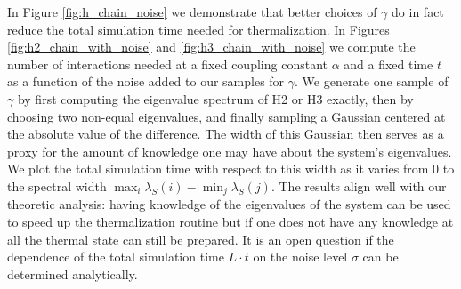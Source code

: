 In Figure \ref{fig:h_chain_noise} we demonstrate that better choices of $\gamma$ do in fact reduce the total simulation time needed for thermalization. In Figures \ref{fig:h2_chain_with_noise} and \ref{fig:h3_chain_with_noise} we compute the number of interactions needed at a fixed coupling constant $\alpha$ and a fixed time $t$ as a function of the noise added to our samples for $\gamma$. We generate one sample of $\gamma$ by first computing the eigenvalue spectrum of H2 or H3 exactly, then by choosing two non-equal eigenvalues, and finally sampling a Gaussian centered at the absolute value of the difference. The width of this Gaussian then serves as a proxy for the amount of knowledge one may have about the system's eigenvalues. We plot the total simulation time with respect to this width as it varies from 0 to the spectral width $\max_i \lambda_S(i) - \min_j \lambda_S(j)$. The results align well with our theoretic analysis: having knowledge of the eigenvalues of the system can be used to speed up the thermalization routine but if one does not have any knowledge at all the thermal state can still be prepared. It is an open question if the dependence of the total simulation time $L \cdot t$ on the noise level $\sigma$ can be determined analytically.
